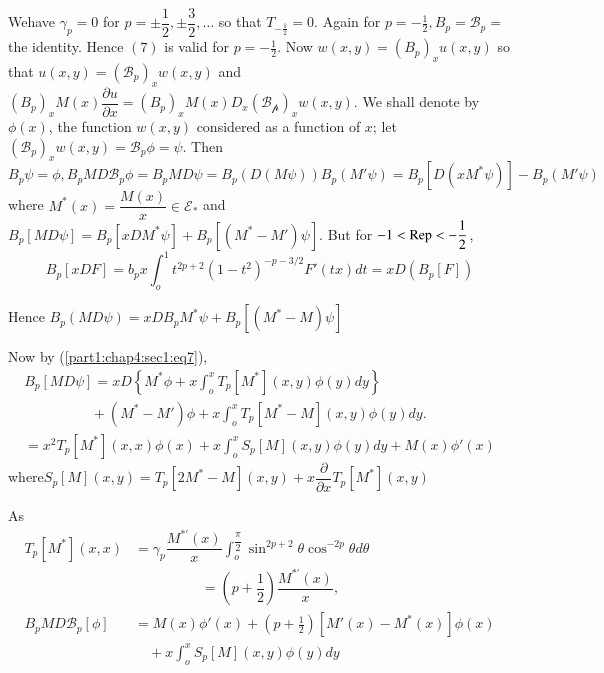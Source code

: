 \begin{remark*}
  We\pageoriginale have $\gamma_p = 0$ for $p = \pm \dfrac{1}{2},  \pm \dfrac{3}{2},
  \ldots$ so that $T_{-\frac{1}{2}}= 0$. Again for $p = - \frac{1}{2},
  B_p = \mathscr{B}_p =$ the identity. Hence $(7)$ is valid for $p =-
  \frac{1}{2}$. Now $w(x, y) = (B_p )_x u(x, y)$ so that $u (x, y) =
  (\mathscr{B}_p)_x w(x, y)$ and $(B_p)_x M(x) \dfrac{\partial
    u}{\partial x} = (B_p)_x M(x) D_x (\mathscr{B_p})_x w(x, y)$. We
  shall denote by  $\phi (x)$, the function $w(x, y)$ considered as a
  function of $x$; let $(\mathscr{B}_p)_x w(x,y) = \mathscr{B}_p \phi
  = \psi$. Then $B_p \psi = \phi, B_p MD \mathscr{B}_p \phi = B_p MD
  \psi = B_p (D (M \psi))  B_p (M' \psi)= B_p [D (xM^* \psi )]- B_p
  (M' \psi) $ where $M^* (x) = \dfrac{M(x)}{x} \in \mathscr{E}_{*}$ and
  $B_p [MD \psi] = B_p [x DM^* \psi ] + B_p [(M^* - M') \psi]$. But for
  $-1 < \operatorname{Rep} <- \dfrac{1}{2}$, 
  $$
  B_p [x DF] = b_p x \int_{o}^{1 }t^{2p+2} (1-t^2)^{-p-3/2} F' (tx) dt
  = x D(B_p [F])  
  $$

  Hence $B_p (MD \psi) = x DB_p M^* \psi + B_p [(M^* - M) \psi]$

  Now by (\ref{part1:chap4:sec1:eq7}),
  \begin{multline*}
    B_p [MD \psi]  = xD \left\{ M^* \phi + x \int_o^x T_p [M^*] (x,y) \phi
    (y) dy \right\}\\ 
     \hspace{2cm}+ (M^* - M') \phi +x \int_{o}^{x} T_p [M^* - M ] (x, y)
    \phi (y) dy.\\ 
    = x^2 T_p [M^*] (x, x) \phi (x) + x \int_o^x S_p [M] (x, y) \phi (y)
    dy + M (x) \phi' (x) 
  \end{multline*}
  where\pageoriginale $S_p [M] (x,y) = T_p [2M^* - M] (x,y) + x
  \dfrac{\partial}{\partial x} T_p [M^*] (x,y)$ 
\end{remark*}  
As 
\begin{align*}
  T_p [M^*] (x, x) & = \gamma_p \dfrac{M^{*'} (x) }{x} \int_o
 ^{\dfrac{\pi}{2}} \sin^{2p+2} \theta  \cos^{-2p} \theta  d \theta  \\
  & \hspace{2cm}= \left(p+\dfrac{1}{2}\right) \dfrac{M^{*'} (x)}{x},\\ 
  B_p MD \mathscr{B}_p [\phi] & = M(x) \phi' (x) + \left(p +
  \frac{1}{2}\right) [M' (x) - M^* (x)]\phi (x)\\ 
  & \quad + x\int^{x}_o S_p [M](x, y) \phi (y) dy 
\end{align*}


